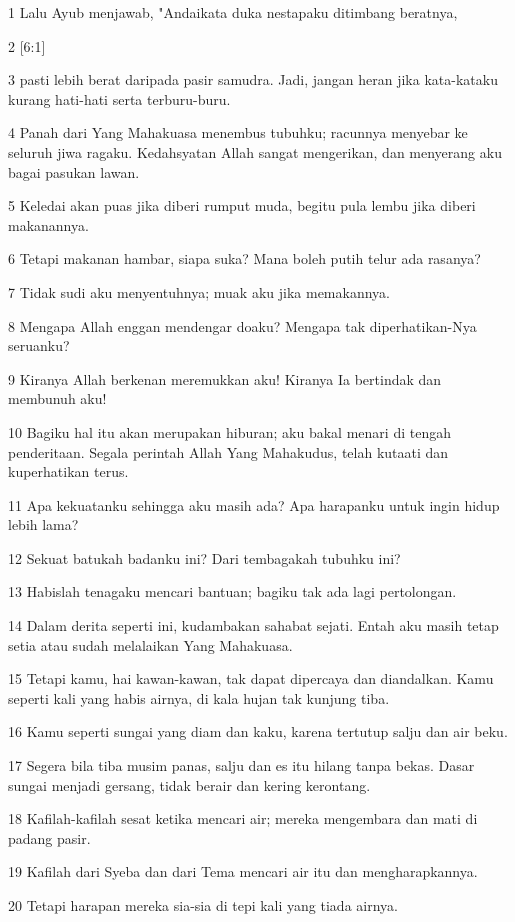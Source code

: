 \par 1 Lalu Ayub menjawab, "Andaikata duka nestapaku ditimbang beratnya,
\par 2 [6:1]
\par 3 pasti lebih berat daripada pasir samudra. Jadi, jangan heran jika kata-kataku kurang hati-hati serta terburu-buru.
\par 4 Panah dari Yang Mahakuasa menembus tubuhku; racunnya menyebar ke seluruh jiwa ragaku. Kedahsyatan Allah sangat mengerikan, dan menyerang aku bagai pasukan lawan.
\par 5 Keledai akan puas jika diberi rumput muda, begitu pula lembu jika diberi makanannya.
\par 6 Tetapi makanan hambar, siapa suka? Mana boleh putih telur ada rasanya?
\par 7 Tidak sudi aku menyentuhnya; muak aku jika memakannya.
\par 8 Mengapa Allah enggan mendengar doaku? Mengapa tak diperhatikan-Nya seruanku?
\par 9 Kiranya Allah berkenan meremukkan aku! Kiranya Ia bertindak dan membunuh aku!
\par 10 Bagiku hal itu akan merupakan hiburan; aku bakal menari di tengah penderitaan. Segala perintah Allah Yang Mahakudus, telah kutaati dan kuperhatikan terus.
\par 11 Apa kekuatanku sehingga aku masih ada? Apa harapanku untuk ingin hidup lebih lama?
\par 12 Sekuat batukah badanku ini? Dari tembagakah tubuhku ini?
\par 13 Habislah tenagaku mencari bantuan; bagiku tak ada lagi pertolongan.
\par 14 Dalam derita seperti ini, kudambakan sahabat sejati. Entah aku masih tetap setia atau sudah melalaikan Yang Mahakuasa.
\par 15 Tetapi kamu, hai kawan-kawan, tak dapat dipercaya dan diandalkan. Kamu seperti kali yang habis airnya, di kala hujan tak kunjung tiba.
\par 16 Kamu seperti sungai yang diam dan kaku, karena tertutup salju dan air beku.
\par 17 Segera bila tiba musim panas, salju dan es itu hilang tanpa bekas. Dasar sungai menjadi gersang, tidak berair dan kering kerontang.
\par 18 Kafilah-kafilah sesat ketika mencari air; mereka mengembara dan mati di padang pasir.
\par 19 Kafilah dari Syeba dan dari Tema mencari air itu dan mengharapkannya.
\par 20 Tetapi harapan mereka sia-sia di tepi kali yang tiada airnya.
